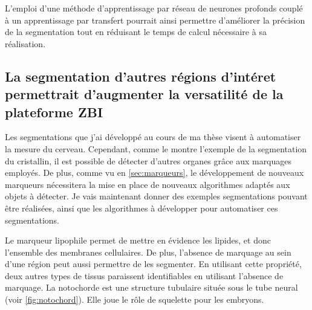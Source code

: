 \documentclass[\main/main.tex]{subfiles}
\begin{document}
L'emploi d'une méthode d'apprentissage par réseau de neurones profonds couplé à un apprentissage par transfert pourrait ainsi permettre d'améliorer la précision de la segmentation tout en réduisant le temps de calcul nécessaire à sa réalisation.

    \subsection{La segmentation d'autres régions d'intéret permettrait d'augmenter la versatilité de la plateforme ZBI}
 
%   
Les segmentations que j'ai développé au cours de ma thèse visent à automatiser la mesure du cerveau.
%
Cependant, comme le montre l'exemple de la segmentation du cristallin,
il est possible de détecter d'autres organes grâce aux marquages employés.
%
De plus, comme vu en \autoref{sec:marqueurs}, le développement de nouveaux marqueurs nécessitera la mise en place de nouveaux algorithmes adaptés aux objets à détecter.
%
Je vais maintenant donner des exemples segmentations pouvant être réalisées, ainsi que les algorithmes à développer pour automatiser ces segmentations.

%
Le marqueur lipophile permet de mettre en évidence les lipides, et donc l'ensemble des membranes cellulaires. De plus, l'absence de marquage au sein d'une région peut aussi permettre de les segmenter.
%
En utilisant cette propriété, deux autres types de tissus paraissent identifiables en utilisant l'absence de marquage. La notochorde est une structure tubulaire située sous le tube neural (voir \autoref{fig:notochord}). Elle joue le rôle de squelette pour les embryons.

\end{document}
